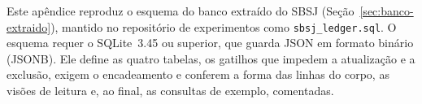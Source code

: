 Este apêndice reproduz o esquema do banco extraído do SBSJ (Seção~\ref{sec:banco-extraido}), mantido no repositório de experimentos \cite{aeroledger_experimentos} como \texttt{sbsj\_ledger.sql}. O esquema requer o SQLite~3.45 ou superior, que guarda JSON em formato binário (JSONB). Ele define as quatro tabelas, os gatilhos que impedem a atualização e a exclusão, exigem o encadeamento e conferem a forma das linhas do corpo, as visões de leitura e, ao final, as consultas de exemplo, comentadas.

{\scriptsize
{}
}
